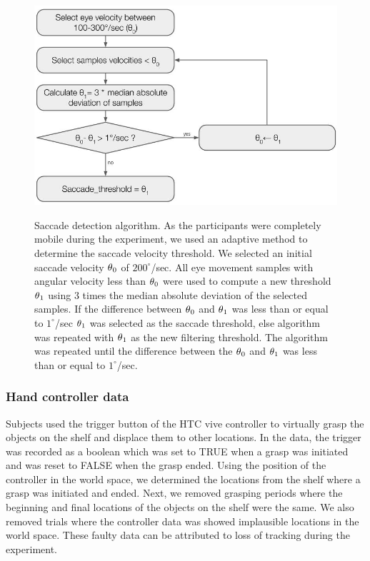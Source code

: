 \begin{figure}[H]
    \centering
    \includegraphics[width=0.5\linewidth]{source/figures/experiment_setup/saccade_detection.jpg} \\
    \caption[]{Saccade detection algorithm. As the participants were completely mobile during the experiment, we used an adaptive method to determine the saccade velocity threshold. We selected an initial saccade velocity $\theta\textsubscript{0}$ of $200^\circ$/sec. All eye movement samples with angular velocity less than $\theta\textsubscript{0}$ were used to compute a new threshold $\theta\textsubscript{1}$  using 3 times the median absolute deviation of the selected samples. If the difference between $\theta\textsubscript{0}$ and $\theta\textsubscript{1}$ was less than or equal to $1^\circ$/sec $\theta\textsubscript{1}$ was selected as the saccade threshold, else algorithm was repeated with $\theta\textsubscript{1}$ as the new filtering threshold. The algorithm was repeated until the difference between the $\theta\textsubscript{0}$ and $\theta\textsubscript{1}$ was less than or equal to $1^\circ$/sec.}
    \label{figure:at_mad}
\end{figure}

\subsubsection{Hand controller data}

Subjects used the trigger button of the HTC vive controller to virtually grasp the objects on the shelf and displace them to other locations. In the data, the trigger was recorded as a boolean which was set to TRUE when a grasp was initiated and was reset to FALSE when the grasp ended. Using the position of the controller in the world space, we determined the locations from the shelf where a grasp was initiated and ended. Next, we removed grasping periods where the beginning and final locations of the objects on the shelf were the same. We also removed trials where the controller data was showed implausible locations in the world space. These faulty data can be attributed to loss of tracking during the experiment. 

